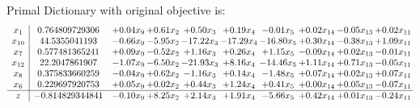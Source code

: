 \documentclass[9pt]{article}
\begin{document}
Primal Dictionary with original objective is:
\[\begin{array}{c| c c@{\hskip 2pt} c@{\hskip 2pt} c@{\hskip 2pt} c@{\hskip 2pt} c@{\hskip 2pt} c@{\hskip 2pt} c@{\hskip 2pt} c@{\hskip 2pt} }
 x_{1}   &  0.764809729306 & +  0.04 x_{9} & +  0.61 x_{2} & +  0.50 x_{3} & +  0.19 x_{4} & -0.01 x_{5} & +  0.02 x_{14} & -0.05 x_{13} & +  0.02 x_{11}\\
 x_{10}   &  44.5355041193 & -0.66 x_{9} & -5.95 x_{2} & -17.22 x_{3} & -17.29 x_{4} & -16.80 x_{5} & +  0.30 x_{14} & -0.38 x_{13} & +  1.09 x_{11}\\
 x_{7}   &  0.577481365241 & +  0.09 x_{9} & -0.52 x_{2} & +  1.16 x_{3} & +  0.26 x_{4} & +  1.15 x_{5} & -0.09 x_{14} & +  0.02 x_{13} & -0.01 x_{11}\\
 x_{12}   &  22.2047861907 & -1.07 x_{9} & -6.50 x_{2} & -21.93 x_{3} & +  8.16 x_{4} & -14.46 x_{5} & +  1.11 x_{14} & +  0.71 x_{13} & -0.05 x_{11}\\
 x_{8}   &  0.375833660259 & -0.04 x_{9} & +  0.62 x_{2} & -1.16 x_{3} & +  0.14 x_{4} & -1.48 x_{5} & +  0.07 x_{14} & +  0.02 x_{13} & +  0.07 x_{11}\\
 x_{6}   &  0.229697920753 & +  0.05 x_{9} & +  0.02 x_{2} & +  0.44 x_{3} & +  1.24 x_{4} & +  0.41 x_{5} & +  0.00 x_{14} & +  0.05 x_{13} & -0.07 x_{11}\\
\hline
z    &  -0.814829344841 & -0.10 x_{9} & +  8.25 x_{2} & +  2.14 x_{3} & +  1.91 x_{4} & -5.66 x_{5} & +  0.42 x_{14} & +  0.01 x_{13} & -0.24 x_{11}\\
\end{array}\]
\end{document}
